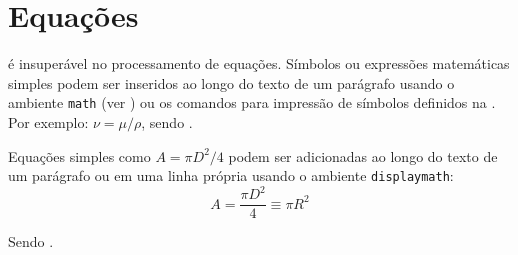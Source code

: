 \section{Equações}%
\label{sect:eq}

 é insuperável no processamento de equações.
Símbolos ou expressões matemáticas simples podem ser inseridos ao longo do texto de um parágrafo usando o ambiente \texttt{math} (ver ) ou os comandos para impressão de símbolos definidos na .
Por exemplo: $\nu = \mu / \rho$, sendo .

Equações simples como $A = \pi D^2 / 4$ podem ser adicionadas ao longo do texto de um parágrafo ou em uma linha própria usando o ambiente \texttt{displaymath}:
\begin{displaymath}
A = \frac{\pi D^2}{4} \equiv \pi R^2
\end{displaymath}

\noindent Sendo .

